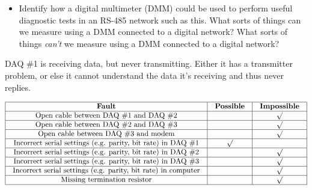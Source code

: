 \begin{itemize}
\item{} Identify how a digital multimeter (DMM) could be used to perform useful diagnostic tests in an RS-485 network such as this.  What sorts of things can we measure using a DMM connected to a digital network?  What sorts of things {\it can't} we measure using a DMM connected to a digital network?
\end{itemize}














DAQ \#1 is receiving data, but never transmitting.  Either it has a transmitter problem, or else it cannot understand the data it's receiving and thus never replies.


$$\vbox{\offinterlineskip
\halign{\strut
\vrule \quad\hfil # \ \hfil & 
\vrule \quad\hfil # \ \hfil & 
\vrule \quad\hfil # \ \hfil \vrule \cr
\noalign{\hrule}
%
{\bf Fault} & {\bf Possible} & {\bf Impossible} \cr
%
\noalign{\hrule}
%
Open cable between DAQ \#1 and DAQ \#2 &  & $\surd$ \cr
%
\noalign{\hrule}
%
Open cable between DAQ \#2 and DAQ \#3 &  & $\surd$ \cr
%
\noalign{\hrule}
%
Open cable between DAQ \#3 and modem &  & $\surd$ \cr
%
\noalign{\hrule}
%
Incorrect serial settings (e.g. parity, bit rate) in DAQ \#1 & $\surd$ &  \cr
%
\noalign{\hrule}
%
Incorrect serial settings (e.g. parity, bit rate) in DAQ \#2 &  & $\surd$ \cr
%
\noalign{\hrule}
%
Incorrect serial settings (e.g. parity, bit rate) in DAQ \#3 &  & $\surd$ \cr
%
\noalign{\hrule}
%
Incorrect serial settings (e.g. parity, bit rate) in computer &  & $\surd$ \cr
%
\noalign{\hrule}
%
Missing termination resistor &  & $\surd$ \cr
%
\noalign{\hrule}
} %
}$$ %





